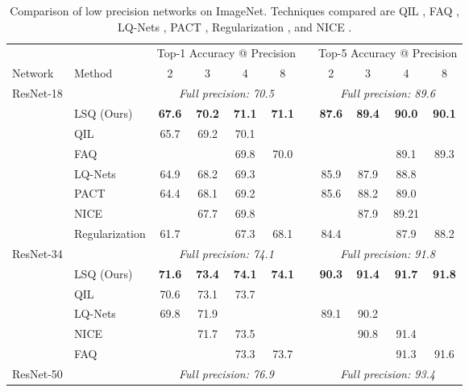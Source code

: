 \documentclass{article}
\newcommand{\tb}{\textbf}
\begin{document}
\begin{table*}[bt]
	\caption{Comparison of low precision networks on ImageNet.
	Techniques compared are QIL \citep{jung2018joint}, FAQ \citep{mckinstry2018discovering}, LQ-Nets \citep{zhang2018lq}, PACT \citep{choi2018pact},  Regularization \citep{choi2018learning}, and NICE \citep{baskin2018nice}.
	}
	\label{table:top1}
	\setlength\tabcolsep{6pt}
\begin{center}
\small
\begin{tabular}{l l cccc c cccc}
		\toprule
		& & \multicolumn{4}{c}{Top-1 Accuracy @ Precision} & & \multicolumn{4}{c}{Top-5 Accuracy @ Precision} \\
Network & Method & 2 & 3 & 4 & 8 & & 2 & 3 & 4 & 8 \\
		\midrule
		ResNet-18 	& & \multicolumn{4}{c}{{\textit{Full precision: 70.5}}} & & \multicolumn{4}{c}{{\textit{Full precision: 89.6}}} \\
					&	LSQ (Ours) 	 	& \tb{67.6}	& \tb{70.2}& \tb{71.1}& \tb{71.1}& 	& \tb{87.6}	& \tb{89.4}	& \tb{90.0}	& \tb{90.1} \\
					& 	QIL 				& 65.7 	& 69.2 	& 70.1 	& 		& 	&  \\
					&	FAQ				&		& 		& 69.8	& 70.0	& 	& 		&		& 89.1	& 89.3 \\			
					& 	LQ-Nets 			& 64.9	& 68.2 	& 69.3 	&  		&	& 85.9 	& 87.9	& 88.8	& \\		
					&	PACT 			& 64.4	& 68.1 	& 69.2 	&  		&	& 85.6	& 88.2	& 89.0	& \\
					&	NICE			& 		& 67.7	& 69.8	&		&	& 		& 87.9	& 89.21	& \\			
					& 	Regularization		& 61.7	& 		& 67.3	& 68.1	&	& 84.4	&		& 87.9	& 88.2 \\	
		\midrule
		ResNet-34	& & \multicolumn{4}{c}{{\textit{Full precision: 74.1}}} & & \multicolumn{4}{c}{{\textit{Full precision: 91.8}}} \\
					&	LSQ (Ours) 	 	& \tb{71.6}& \tb{73.4} & \tb{74.1}& \tb{74.1}& 	& \tb{90.3}	& \tb{91.4}	& \tb{91.7}	&\tb{91.8} \\
					& 	QIL 				& 70.6 	& 73.1 	& 73.7 	& 		& 	&  \\					
					&	LQ-Nets			& 69.8	& 71.9	&		&		& 	& 89.1	& 90.2	&		& \\
					&	NICE			& 		& 71.7	& 73.5	&		&	& 		& 90.8	& 91.4	& \\
					&	FAQ				& 		& 		& 73.3	& 73.7	&	&		&		& 91.3	& 91.6 \\	
		\midrule		
		ResNet-50	& & \multicolumn{4}{c}{{\textit{Full precision: 76.9}}} & & \multicolumn{4}{c}{{\textit{Full precision: 93.4}}} \\		

\end{tabular}
\end{center}
\end{table*}
\end{document}
